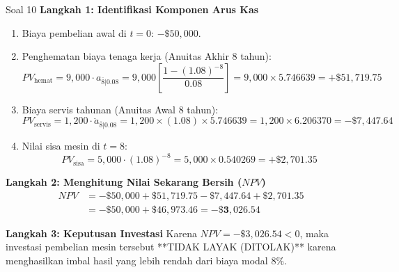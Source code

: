 \documentclass[11pt,a4paper]{article}
\begin{document}
\begin{solutionbox}{Soal 10}
\textbf{Langkah 1: Identifikasi Komponen Arus Kas}
\begin{enumerate}[label=\textbf{\arabic*.}]
    \item Biaya pembelian awal di $t = 0$: $-\$50{,}000$.
    \item Penghematan biaya tenaga kerja (Anuitas Akhir 8 tahun):
    \begin{equation*}
        PV_{\text{hemat}} = 9{,}000 \cdot a_{\overline{8}|0.08} = 9{,}000 \left[\frac{1 - (1.08)^{-8}}{0.08}\right] = 9{,}000 \times 5.746639 = +\$51{,}719.75
    \end{equation*}
    \item Biaya servis tahunan (Anuitas Awal 8 tahun):
    \begin{equation*}
        PV_{\text{servis}} = 1{,}200 \cdot \ddot{a}_{\overline{8}|0.08} = 1{,}200 \times (1.08) \times 5.746639 = 1{,}200 \times 6.206370 = -\$7{,}447.64
    \end{equation*}
    \item Nilai sisa mesin di $t = 8$:
    \begin{equation*}
        PV_{\text{sisa}} = 5{,}000 \cdot (1.08)^{-8} = 5{,}000 \times 0.540269 = +\$2{,}701.35
    \end{equation*}
\end{enumerate}

\textbf{Langkah 2: Menghitung Nilai Sekarang Bersih ($NPV$)}
\begin{align*}
    NPV &= -\$50{,}000 + \$51{,}719.75 - \$7{,}447.64 + \$2{,}701.35 \\
        &= -\$50{,}000 + \$46{,}973.46 = \mathbf{-\$3{,}026.54}
\end{align*}

\textbf{Langkah 3: Keputusan Investasi}
Karena $NPV = -\$3{,}026.54 < 0$, maka investasi pembelian mesin tersebut **TIDAK LAYAK (DITOLAK)** karena menghasilkan imbal hasil yang lebih rendah dari biaya modal $8\%$.
\end{solutionbox}
\end{document}
